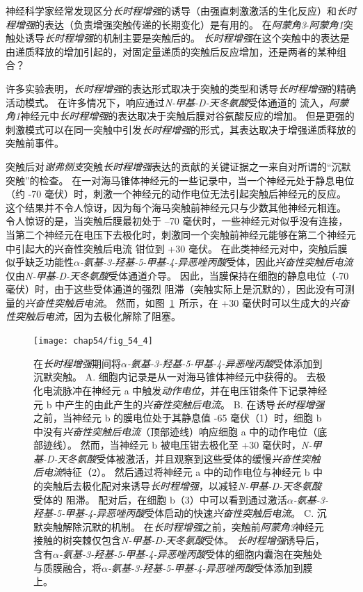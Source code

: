 神经科学家经常发现区分\textit{长时程增强}的诱导（由强直刺激激活的生化反应）和\textit{长时程增强}的表达（负责增强突触传递的长期变化）是有用的。
在\textit{阿蒙角3}-\textit{阿蒙角1}突触处诱导\textit{长时程增强}的机制主要是突触后的。
\textit{长时程增强}在这个突触中的表达是由递质释放的增加引起的，对固定量递质的突触后反应增加，还是两者的某种组合？


许多实验表明，\textit{长时程增强}的表达形式取决于突触的类型和诱导\textit{长时程增强}的精确活动模式。
在许多情况下，响应通过\textit{N-甲基-D-天冬氨酸}受体通道的  流入，\textit{阿蒙角1}神经元中\textit{长时程增强}的表达取决于突触后膜对谷氨酸反应的增加。
但是更强的刺激模式可以在同一突触中引发\textit{长时程增强}的形式，其表达取决于增强递质释放的突触前事件。


突触后对\textit{谢弗侧支}突触\textit{长时程增强}表达的贡献的关键证据之一来自对所谓的“沉默突触”的检查。
在一对海马锥体神经元的一些记录中，当一个神经元处于静息电位（约 -70 毫伏）时，刺激一个神经元的动作电位无法引起突触后神经元的反应。
这个结果并不令人惊讶，因为每个海马突触前神经元只与少数其他神经元相连。
令人惊讶的是，当突触后膜最初处于 –70 毫伏时，一些神经元对似乎没有连接，当第二个神经元在电压下去极化时，刺激同一个突触前神经元能够在第二个神经元中引起大的兴奋性突触后电流 钳位到 +30 毫伏。
在此类神经元对中，突触后膜似乎缺乏功能性\textit{$\alpha$-氨基-3-羟基-5-甲基-4-异恶唑丙酸}受体，因此\textit{兴奋性突触后电流}仅由\textit{N-甲基-D-天冬氨酸}受体通道介导。
因此，当膜保持在细胞的静息电位（-70 毫伏）时，由于这些受体通道的强烈  阻滞（突触实际上是沉默的），因此没有可测量的\textit{兴奋性突触后电流}。
然而，如图~\ref{fig:54_4}~所示，在 +30 毫伏时可以生成大的\textit{兴奋性突触后电流}，因为去极化解除了阻塞。


\begin{figure}[htbp]
	\centering
	\texttt{[image: chap54/fig\_54\_4]}
	\caption{在\textit{长时程增强}期间将\textit{$\alpha$-氨基-3-羟基-5-甲基-4-异恶唑丙酸}受体添加到沉默突触。
		A. 细胞内记录是从一对海马锥体神经元中获得的。
		去极化电流脉冲在神经元 a 中触发\textit{动作电位}，并在电压钳条件下记录神经元 b 中产生的由此产生的\textit{兴奋性突触后电流}。
		B. 在诱导\textit{长时程增强}之前，当神经元 b 的膜电位处于其静息值 -65 毫伏（1）时，细胞 b 中没有\textit{兴奋性突触后电流}（顶部迹线）响应细胞 a 中的动作电位（底部迹线）。
		然而，当神经元 b 被电压钳去极化至 +30 毫伏时，\textit{N-甲基-D-天冬氨酸}受体被激活，并且观察到这些受体的缓慢\textit{兴奋性突触后电流}特征（2）。
		然后通过将神经元 a 中的动作电位与神经元 b 中的突触后去极化配对来诱导\textit{长时程增强}，以减轻\textit{N-甲基-D-天冬氨酸}受体的  阻滞。
		配对后，在细胞 b（3）中可以看到通过激活\textit{$\alpha$-氨基-3-羟基-5-甲基-4-异恶唑丙酸}受体启动的快速\textit{兴奋性突触后电流}\cite{montgomery2001pair}。
		C. 沉默突触解除沉默的机制。
		在\textit{长时程增强}之前，突触前\textit{阿蒙角3}神经元接触的树突棘仅包含\textit{N-甲基-D-天冬氨酸}受体。
		\textit{长时程增强}诱导后，含有\textit{$\alpha$-氨基-3-羟基-5-甲基-4-异恶唑丙酸}受体的细胞内囊泡在突触处与质膜融合，将\textit{$\alpha$-氨基-3-羟基-5-甲基-4-异恶唑丙酸}受体添加到膜上。}
	\label{fig:54_4}
\end{figure}


